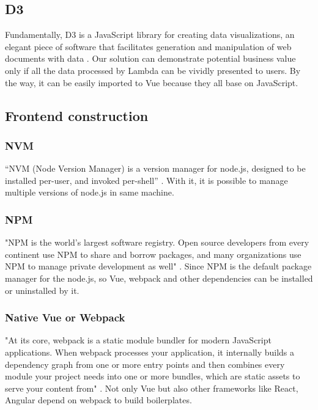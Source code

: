 \documentclass[conference]{IEEEtran}
\begin{document}
\subsection{D3}

Fundamentally, D3 is a JavaScript library for creating data visualizations, an elegant piece of software that facilitates 
generation and manipulation of web documents with data \cite{2013Interactive}. Our solution can demonstrate potential business 
value only if all the data processed by Lambda can be vividly presented to users. By the way, it can be easily imported to 
Vue because they all base on JavaScript.
 
\subsection{Frontend construction}

\subsubsection{NVM}
    
“NVM (Node Version Manager) is a version manager for node.js, designed to be installed per-user, and invoked per-shell” 
\cite{nvmshnvm87:online}. With it, it is possible to manage multiple versions of node.js in same machine.

\subsubsection{NPM}

"NPM is the world's largest software registry. Open source developers from every continent use NPM to share and borrow packages, 
and many organizations use NPM to manage private development as well" \cite{Aboutnpm31:online}. Since NPM is the default package manager for the 
node.js, so Vue, webpack and other dependencies can be installed or uninstalled by it.

\subsubsection{Native Vue or Webpack}

"At its core, webpack is a static module bundler for modern JavaScript applications. When webpack processes your application, it 
internally builds a dependency graph from one or more entry points and then combines every module your project needs into one or 
more bundles, which are static assets to serve your content from" \cite{Concepts28:online}. Not only Vue but also other frameworks like React, 
Angular depend on webpack to build boilerplates.
\end{document}
